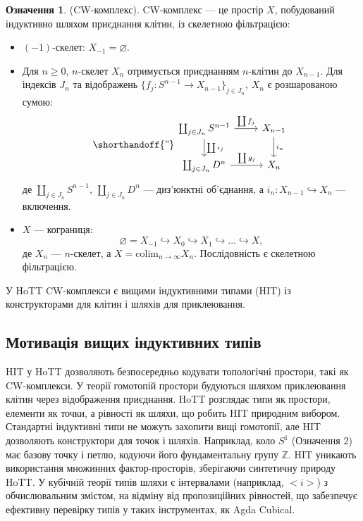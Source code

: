 \documentclass{article}
\theoremstyle{definition}
\newtheorem{definition}{Означення}
\newcommand*{\incmap}{\hookrightarrow}
\begin{document}
\begin{definition} (CW-комплекс).
CW-комплекс — це простір \( X \), побудований індуктивно шляхом приєднання клітин, із скелетною фільтрацією:
\begin{itemize}
    \item \((-1)\)-скелет: \( X_{-1} = \varnothing \).
    \item Для \( n \geq 0 \), \( n \)-скелет \( X_n \) отримується приєднанням \( n \)-клітин до \( X_{n-1} \). Для
      індексів \( J_n \) та відображень \( \{ f_j : S^{n-1} \to X_{n-1}
      \}_{j \in J_n} \), \( X_n \) є розшарованою сумою:
    \[
    \shorthandoff{"}
    \begin{tikzcd}
    \coprod_{j \in J_n} S^{n-1} \arrow[r, "\coprod f_j"] \arrow[d, "\coprod \iota_j"] & X_{n-1} \arrow[d, "i_n"] \\
    \coprod_{j \in J_n} D^n \arrow[r, "\coprod g_j"] & X_n
    \end{tikzcd}
    \]
    де \( \coprod_{j \in J_n} S^{n-1} \), \( \coprod_{j \in
    J_n} D^n \) — диз’юнктні об’єднання, а \( i_n : X_{n-1}
    \incmap X_n \) — включення.
    \item \( X \) — кограниця:
    \[
    \varnothing = X_{-1} \incmap X_0 \incmap X_1 \incmap \dots
    \incmap X,
    \]
    де \( X_n \) — \( n \)-скелет, а \( X = \text{colim}_{n
    \to \infty} X_n \). Послідовність є скелетною фільтрацією.
\end{itemize}
У HoTT CW-комплекси є вищими індуктивними типами (HIT)
із конструкторами для клітин і шляхів для приклеювання.
\end{definition}

\newpage
\subsection{Мотивація вищих індуктивних типів}
HIT у HoTT дозволяють безпосередньо кодувати топологічні простори, такі як
CW-комплекси. У теорії гомотопій простори будуються шляхом приклеювання
клітин через відображення приєднання. HoTT розглядає типи як простори, елементи
як точки, а рівності як шляхи, що робить HIT природним вибором.
Стандартні індуктивні типи не можуть захопити вищі гомотопії, але
HIT дозволяють конструктори для точок і шляхів. Наприклад, коло \( S^1 \) (Означення 2) має базову точку і петлю, кодуючи його
фундаментальну групу \( \mathbb{Z} \). HIT уникають використання множинних
фактор-просторів, зберігаючи синтетичну природу HoTT. У кубічній теорії типів шляхи є
інтервалами (наприклад, \( <i> \)) з обчислювальним змістом, на відміну від
пропозиційних рівностей, що забезпечує ефективну перевірку типів у таких
інструментах, як Agda Cubical.
\end{document}

